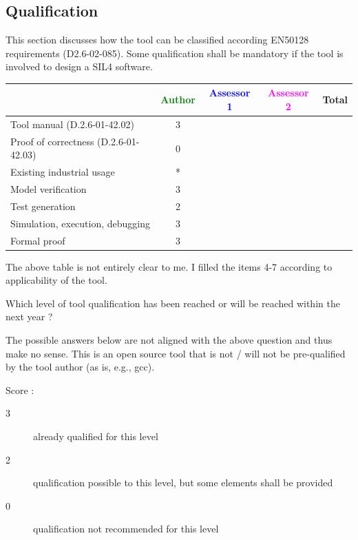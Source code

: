 \subsection{Qualification}

This section discusses how the tool can be classified according EN50128 requirements (D2.6-02-085). Some qualification shall be mandatory  if the tool is involved to design a SIL4 software.


\begin{tabular}{|l | c | c | c | c|}
\hline
& \textcolor{green}{Author} & \textcolor{blue}{Assessor 1} & \textcolor{magenta}{Assessor 2} & Total \\
\hline 
Tool manual (D.2.6-01-42.02) &3& & &  \\
\hline
Proof of correctness (D.2.6-01-42.03)   &0& & & \\
\hline
Existing industrial  usage  &*& & & \\
\hline
Model verification &3 & & & \\
\hline
Test generation &2& & & \\
\hline
Simulation, execution, debugging &3& & & \\
\hline
Formal proof &3& & & \\
\hline
\end{tabular}

\begin{author_comment}
The above table is not entirely clear to me. I filled the items 4-7 according to applicability of the tool.
\end{author_comment}

Which level of tool qualification has been reached or will be reached within the next year ?

\begin{author_comment}
The possible answers below are not aligned with the above question and thus make no sense. This is an open source tool that is not / will not be pre-qualified by the tool author (as is, e.g., gcc).
\end{author_comment}


Score :
\begin{description}
\item[3] already qualified for this level
\item[2] qualification possible to this level, but some elements shall be provided
\item[0] qualification not recommended for this level
\end{description}


